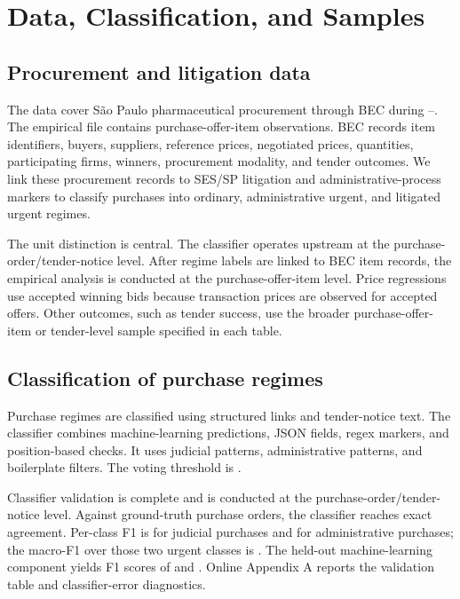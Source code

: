 \section{Data, Classification, and Samples}
\label{sec:data}

\subsection{Procurement and litigation data}
\label{subsec:data_sources}

The data cover S\~ao Paulo pharmaceutical procurement through BEC during \BPsampleStartYear--\BPsampleEndYear. The empirical file contains \BPnPOIfull{} purchase-offer-item observations. BEC records item identifiers, buyers, suppliers, reference prices, negotiated prices, quantities, participating firms, winners, procurement modality, and tender outcomes. We link these procurement records to SES/SP litigation and administrative-process markers to classify purchases into ordinary, administrative urgent, and litigated urgent regimes.

The unit distinction is central. The classifier operates upstream at the purchase-order/tender-notice level. After regime labels are linked to BEC item records, the empirical analysis is conducted at the purchase-offer-item level. Price regressions use accepted winning bids because transaction prices are observed for accepted offers. Other outcomes, such as tender success, use the broader purchase-offer-item or tender-level sample specified in each table.

\subsection{Classification of purchase regimes}
\label{subsec:classification}

Purchase regimes are classified using structured links and tender-notice text. The classifier combines machine-learning predictions, JSON fields, regex markers, and position-based checks. It uses \BPclfNPatternsJud{} judicial patterns, \BPclfNPatternsAdm{} administrative patterns, and \BPclfNPatternsBoiler{} boilerplate filters. The voting threshold is \BPclfVoteThreshold{}.

Classifier validation is complete and is conducted at the purchase-order/tender-notice level. Against \BPregexNGroundTruth{} ground-truth purchase orders, the classifier reaches \BPregexExactMatchPct{} exact agreement. Per-class F1 is \BPregexFoneJud{} for judicial purchases and \BPregexFoneAdm{} for administrative purchases; the macro-F1 over those two urgent classes is \BPregexFone{}. The held-out machine-learning component yields F1 scores of \BPregexFoneJudHO{} and \BPregexFoneAdmHO{}. Online Appendix A reports the validation table and classifier-error diagnostics.

